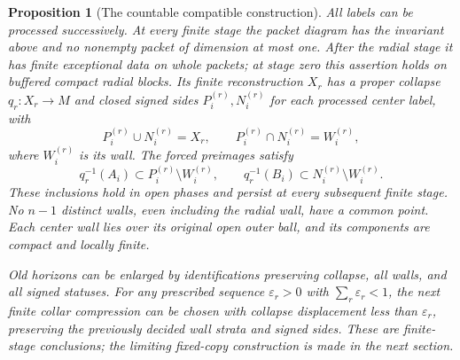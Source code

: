 \documentclass[11pt]{article}
\numberwithin{equation}{section}
\newtheorem{proposition}[theorem]{Proposition}
\theoremstyle{definition}
\theoremstyle{remark}
\begin{document}
\begin{proposition}[The countable compatible construction]\label{countable:construction}
All labels can be processed successively. At every finite stage the
packet diagram has the invariant above and no nonempty packet of
dimension at most one. After the radial stage it has finite exceptional
data on whole packets; at stage zero this assertion holds on buffered
compact radial blocks.
Its finite reconstruction $X_r$ has a proper collapse $q_r:X_r\to M$
and closed signed sides $P_i^{(r)},N_i^{(r)}$ for each processed center
label, with
\[
 P_i^{(r)}\cup N_i^{(r)}=X_r,\qquad
 P_i^{(r)}\cap N_i^{(r)}=W_i^{(r)},
\]
where $W_i^{(r)}$ is its wall. The forced preimages satisfy
\[
 q_r^{-1}(A_i)\subset P_i^{(r)}\setminus W_i^{(r)},\qquad
 q_r^{-1}(B_i)\subset N_i^{(r)}\setminus W_i^{(r)}.
\]
These inclusions hold in open phases and persist at every subsequent
finite stage. No $n-1$ distinct walls, even including the radial wall,
have a common point. Each center wall lies over its original open
outer ball, and its components are compact and locally finite.

Old horizons can be enlarged by identifications preserving collapse,
all walls, and all signed statuses. For any prescribed sequence
$\varepsilon_r>0$ with $\sum_r\varepsilon_r<1$, the next finite collar compression
can be chosen with collapse displacement less than $\varepsilon_r$, preserving
the previously decided wall strata and signed sides. These are
finite-stage conclusions; the limiting fixed-copy construction is
made in the next section.
\end{proposition}
\end{document}
